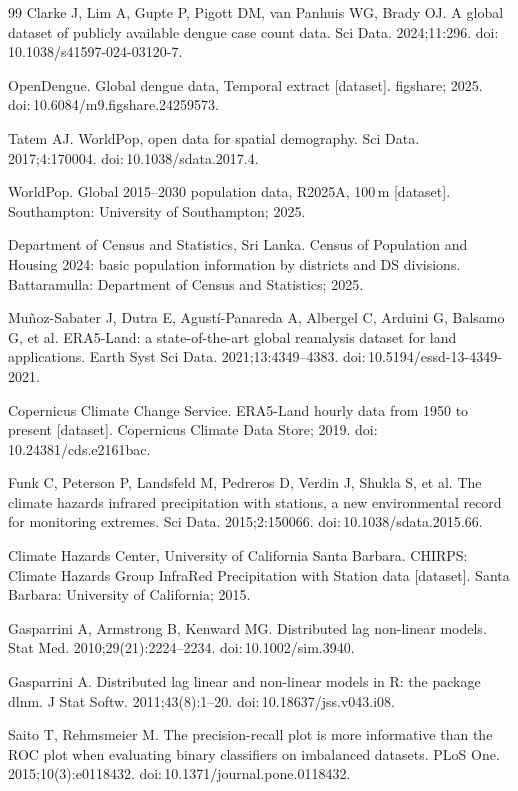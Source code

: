 \documentclass[11pt,a4paper]{article}
\begin{document}
\begin{thebibliography}{99}
 Clarke J, Lim A, Gupte P, Pigott DM, van Panhuis WG, Brady OJ. A global dataset of publicly available dengue case count data. Sci Data. 2024;11:296. doi:\,10.1038/s41597-024-03120-7.

 OpenDengue. Global dengue data, Temporal extract [dataset]. figshare; 2025. doi:\,10.6084/m9.figshare.24259573.

 Tatem AJ. WorldPop, open data for spatial demography. Sci Data. 2017;4:170004. doi:\,10.1038/sdata.2017.4.

 WorldPop. Global 2015--2030 population data, R2025A, 100\,m [dataset]. Southampton: University of Southampton; 2025.

 Department of Census and Statistics, Sri Lanka. Census of Population and Housing 2024: basic population information by districts and DS divisions. Battaramulla: Department of Census and Statistics; 2025.

 Mu\~noz-Sabater J, Dutra E, Agust\'i-Panareda A, Albergel C, Arduini G, Balsamo G, et al. ERA5-Land: a state-of-the-art global reanalysis dataset for land applications. Earth Syst Sci Data. 2021;13:4349--4383. doi:\,10.5194/essd-13-4349-2021.

 Copernicus Climate Change Service. ERA5-Land hourly data from 1950 to present [dataset]. Copernicus Climate Data Store; 2019. doi:\,10.24381/cds.e2161bac.

 Funk C, Peterson P, Landsfeld M, Pedreros D, Verdin J, Shukla S, et al. The climate hazards infrared precipitation with stations, a new environmental record for monitoring extremes. Sci Data. 2015;2:150066. doi:\,10.1038/sdata.2015.66.

 Climate Hazards Center, University of California Santa Barbara. CHIRPS: Climate Hazards Group InfraRed Precipitation with Station data [dataset]. Santa Barbara: University of California; 2015.

 Gasparrini A, Armstrong B, Kenward MG. Distributed lag non-linear models. Stat Med. 2010;29(21):2224--2234. doi:\,10.1002/sim.3940.

 Gasparrini A. Distributed lag linear and non-linear models in R: the package dlnm. J Stat Softw. 2011;43(8):1--20. doi:\,10.18637/jss.v043.i08.

 Saito T, Rehmsmeier M. The precision-recall plot is more informative than the ROC plot when evaluating binary classifiers on imbalanced datasets. PLoS One. 2015;10(3):e0118432. doi:\,10.1371/journal.pone.0118432.


\end{thebibliography}
\end{document}
